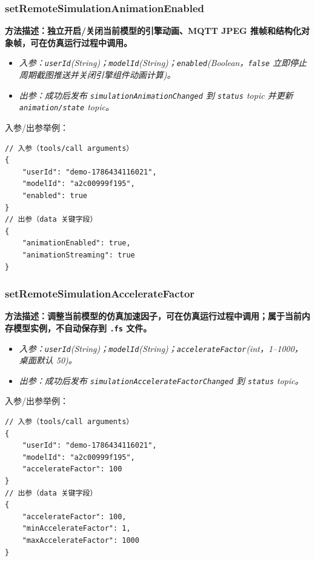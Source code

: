 \subsubsection{setRemoteSimulationAnimationEnabled}
\bf{方法描述}：独立开启/关闭当前模型的引擎动画、MQTT JPEG 推帧和结构化对象帧，可在仿真运行过程中调用。
\begin{itemize}
	\item \it{入参}：\texttt{userId}(String)；\texttt{modelId}(String)；\texttt{enabled}(Boolean，\texttt{false} 立即停止周期截图推送并关闭引擎组件动画计算)。
	\item \it{出参}：成功后发布 \texttt{simulationAnimationChanged} 到 \texttt{status} topic 并更新 \texttt{animation/state} topic。
\end{itemize}
入参/出参举例：
\begin{lstlisting}
// 入参（tools/call arguments）
{
    "userId": "demo-1786434116021",
    "modelId": "a2c00999f195",
    "enabled": true
}
// 出参（data 关键字段）
{
    "animationEnabled": true,
    "animationStreaming": true
}
\end{lstlisting}\vspace{-30pt}

\subsubsection{setRemoteSimulationAccelerateFactor}
\bf{方法描述}：调整当前模型的仿真加速因子，可在仿真运行过程中调用；属于当前内存模型实例，不自动保存到 \texttt{.fs} 文件。
\begin{itemize}
	\item \it{入参}：\texttt{userId}(String)；\texttt{modelId}(String)；\texttt{accelerateFactor}(int，1--1000，桌面默认 50)。
	\item \it{出参}：成功后发布 \texttt{simulationAccelerateFactorChanged} 到 \texttt{status} topic。
\end{itemize}
入参/出参举例：
\begin{lstlisting}
// 入参（tools/call arguments）
{
    "userId": "demo-1786434116021",
    "modelId": "a2c00999f195",
    "accelerateFactor": 100
}
// 出参（data 关键字段）
{
    "accelerateFactor": 100,
    "minAccelerateFactor": 1,
    "maxAccelerateFactor": 1000
}
\end{lstlisting}\vspace{-30pt}

